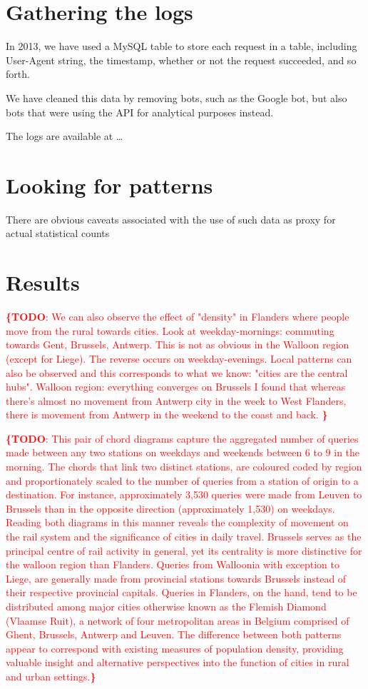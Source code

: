 \documentclass{sig-alternate}
\newcommand{\todo}[1]{\noindent\textcolor{red}{{\bf \{TODO}: #1{\bf \}}}}
\begin{document}
\section{Gathering the logs}
\label{sec:logs}

In 2013, we have used a MySQL table to store each request in a table, including User-Agent string, the timestamp, whether or not the request succeeded, and so forth. 

We have cleaned this data by removing bots, such as the Google bot, but also bots that were using the API for analytical purposes instead.

The logs are available at \ldots

\section{Looking for patterns}
\label{sec:method}

There are obvious caveats associated with the use of such data as proxy for actual statistical counts

\section{Results}
\label{sec:results}
\todo{
We can also observe the effect of "density" in Flanders where people move from the rural towards cities. Look at weekday-mornings: commuting towards Gent, Brussels, Antwerp. This is not as obvious in the Walloon region (except for Liege). The reverse occurs on weekday-evenings. Local patterns can also be observed and this corresponds to what we know: "cities are the central hubs".
Walloon region: everything converges on Brussels
I found that whereas there's almost no movement from Antwerp city in the week to West Flanders, there is movement from Antwerp in the weekend to the coast and back. 
}


\todo{This pair of chord diagrams capture the aggregated number of queries made between any two stations on weekdays and weekends between 6 to 9 in the morning. The chords that link two distinct stations, are coloured coded by region and proportionately scaled to the number of queries from a station of origin to a destination. For instance, approximately 3,530 queries were made from Leuven to Brussels than in the opposite direction (approximately 1,530) on weekdays. Reading both diagrams in this manner reveals the complexity of movement on the rail system and the significance of cities in daily travel. Brussels serves as the principal centre of rail activity in general, yet its centrality is more distinctive for the walloon region than Flanders. Queries from Walloonia with exception to Liege, are generally made from provincial stations towards Brussels instead of their respective provincial capitals. Queries in Flanders, on the hand, tend to be distributed among major cities otherwise known as the Flemish Diamond (Vlaamse Ruit), a network of four metropolitan areas in Belgium comprised of Ghent, Brussels, Antwerp and Leuven. The difference between both patterns appear to correspond with existing measures of population density, providing valuable insight and alternative perspectives into the function of cities in rural and urban settings.}
\end{document}
